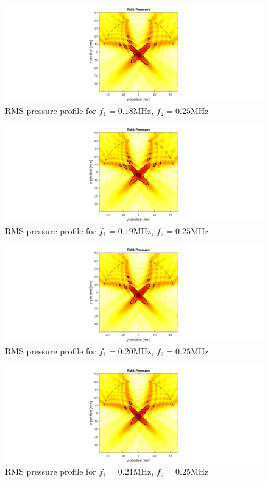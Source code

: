 \documentclass[10pt,a4paper]{article}
\begin{document}
\begin{figure}[!h]
\hspace*{-5cm}                                                    
\includegraphics[scale=0.6]{f180kHz}
\caption{RMS pressure profile for $f_1 = 0.18$MHz, $f_2 = 0.25$MHz}
\end{figure}
\begin{figure}[!h]
\hspace*{-5cm}                                                    
\includegraphics[scale=0.6]{f190kHz}
\caption{RMS pressure profile for $f_1 = 0.19$MHz, $f_2 = 0.25$MHz}
\end{figure}
\begin{figure}[!h]
\hspace*{-5cm}                                                    
\includegraphics[scale=0.6]{f200kHz}
\caption{RMS pressure profile for $f_1 = 0.20$MHz, $f_2 = 0.25$MHz}
\end{figure}
\begin{figure}[!h]
\hspace*{-5cm}                                                    
\includegraphics[scale=0.6]{f210kHz}
\caption{RMS pressure profile for $f_1 = 0.21$MHz, $f_2 = 0.25$MHz}
\end{figure}
\end{document}
